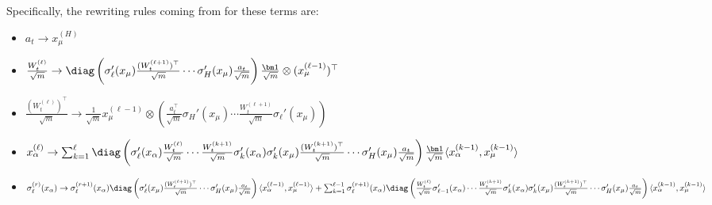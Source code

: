 \documentclass[11pt,a4paper]{article}
\theoremstyle{definition}
\begin{document}
Specifically, the rewriting rules coming from \cite{huang2019dynamics} for these terms are:

\begin{itemize}
\item $a_t\rightarrow x_\mu^{(H)}$

\item $\frac{W_t^{(\ell)}}{\sqrt m}\rightarrow \diag\left(\sigma_\ell'(x_\mu) \frac{(W_t^{(\ell+1)})^\top}{\sqrt m}\cdots \sigma_H' (x_\mu)\frac{a_t}{\sqrt m}\right)\frac{\bm 1}{\sqrt m} \otimes (x_\mu^{(\ell-1)})^\top$

\item $\frac{(W_t^{(\ell)})^\top}{\sqrt m}\rightarrow  \frac{1}{\sqrt m}x_\mu^{(\ell-1)}\otimes \left(\frac{a_t^\top}{\sqrt m}\sigma_H'(x_\mu) \cdots \frac{W_t^{(\ell+1)}}{\sqrt m} \sigma_\ell'(x_\mu)\right)$

\item $x^{(\ell)}_\alpha\rightarrow \sum_{k=1}^\ell \diag\left(\sigma'_\ell(x_\alpha) \frac{W_t^{(\ell)}}{\sqrt m}\cdots \frac{W_t^{(k+1)}}{\sqrt m}\sigma_k'(x_\alpha) \sigma_k'(x_\mu)\frac{(W_t^{(k+1)})^\top}{\sqrt m}\cdots \sigma_H'(x_\mu) \frac{a_t}{\sqrt m}\right)\frac{\bm 1}{\sqrt m} \langle x_\alpha^{(k-1)}, x_\mu^{(k-1)}\rangle$

\item $\sigma_\ell^{(r)}(x_\alpha)\rightarrow\sigma^{(r+1)}_\ell(x_\alpha)\diag\left(\sigma'_\ell(x_\mu)\frac{(W_t^{(\ell+1)})^\top}{\sqrt m}\cdots \sigma_H'(x_\mu) \frac{a_t}{\sqrt m}\right) \langle x_\alpha^{(\ell-1)}, x_\mu^{(\ell-1)}\rangle + \sum_{k=1}^{\ell-1}\sigma^{(r+1)}_\ell(x_\alpha)\diag\left(\frac{W_t^{(\ell)}}{\sqrt m}\sigma_{\ell-1}'(x_\alpha)\cdots \frac{W_t^{(k+1)}}{\sqrt m}\sigma_k'(x_\alpha)\sigma'_k(x_\mu)\frac{(W_t^{(k+1)})^\top}{\sqrt m}\cdots \sigma_H'(x_\mu) \frac{a_t}{\sqrt m}\right) \langle x_\alpha^{(k-1)}, x_\mu^{(k-1)}\rangle$
\end{itemize}
\end{document}
